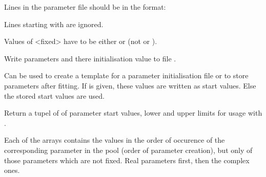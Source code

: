 \documentclass[letterpaper,10pt,english]{sphinxmanual}
\begin{document}
\begin{fulllineitems}
\begin{fulllineitems}
\begin{DUlineblock}{0em}
\item[] Lines in the parameter file should be in the format:
\item[] 
\item[] Lines starting with \sphinxstyleemphasis{\#} are ignored.
\item[] Values of \textless{}fixed\textgreater{} have to be either  or  (not  or ).
\end{DUlineblock}

\end{fulllineitems}


\begin{fulllineitems}
\label{\detokenize{modules-api/parameters:Parameters.ParameterPool.writeToFile}}
Write parameters and there initialisation value to file .

Can be used to create a template for a parameter initialisation file or to store parameters after fitting.
If  is given, these values are written as start values. Else the stored start values are used.

\end{fulllineitems}


\begin{fulllineitems}
\label{\detokenize{modules-api/parameters:Parameters.ParameterPool.getStartLowerUpper}}
Return a tupel of  of parameter start values, lower and upper limits for usage with {\hyperref[\detokenize{modules-api/parameters:Parameters.Fitparameter.getValue}]{}}.

Each of the arrays contains the values in the order of occurence of the corresponding parameter in the pool (order of parameter creation), but only of those parameters which are not fixed. Real parameters first, then the complex ones.


\end{fulllineitems}
\end{fulllineitems}
\end{document}

